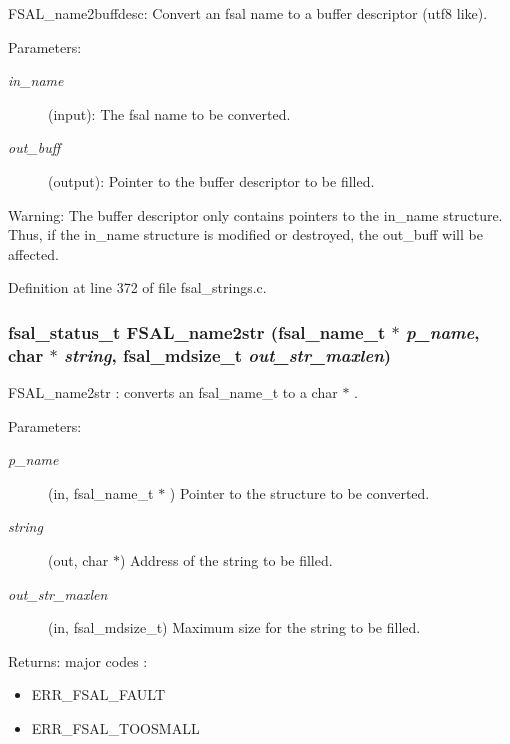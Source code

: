FSAL\_\-name2buffdesc: Convert an fsal name to a buffer descriptor (utf8 like).

\begin{Desc}
\item[Parameters:]
\begin{description}
\item[{\em in\_\-name}](input): The fsal name to be converted. \item[{\em out\_\-buff}](output): Pointer to the buffer descriptor to be filled.\end{description}
\end{Desc}
\begin{Desc}
\item[Warning:]The buffer descriptor only contains pointers to the in\_\-name structure. Thus, if the in\_\-name structure is modified or destroyed, the out\_\-buff will be affected. \end{Desc}


Definition at line 372 of file fsal\_\-strings.c.
\subsubsection[{FSAL\_\-name2str}]{\setlength{\rightskip}{0pt plus 5cm}fsal\_\-status\_\-t FSAL\_\-name2str (fsal\_\-name\_\-t $\ast$ {\em p\_\-name}, \/  char $\ast$ {\em string}, \/  fsal\_\-mdsize\_\-t {\em out\_\-str\_\-maxlen})}\label{group__FSALNameFunctions_gbe3cc709e0609c51e87cdc266fed9b31}


FSAL\_\-name2str : converts an fsal\_\-name\_\-t to a char $\ast$ .

\begin{Desc}
\item[Parameters:]
\begin{description}
\item[{\em p\_\-name}](in, fsal\_\-name\_\-t $\ast$ ) Pointer to the structure to be converted. \item[{\em string}](out, char $\ast$) Address of the string to be filled. \item[{\em out\_\-str\_\-maxlen}](in, fsal\_\-mdsize\_\-t) Maximum size for the string to be filled.\end{description}
\end{Desc}
\begin{Desc}
\item[Returns:]major codes :\begin{itemize}
\item ERR\_\-FSAL\_\-FAULT\item ERR\_\-FSAL\_\-TOOSMALL \end{itemize}
\end{Desc}


